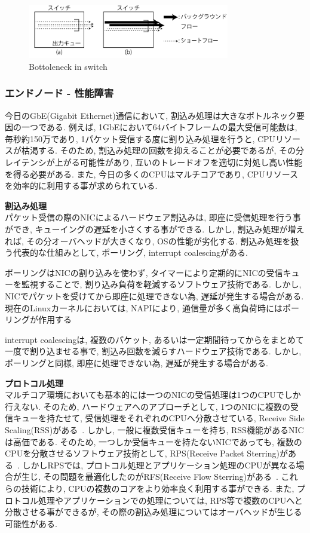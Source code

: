 \begin{figure}[t]
    \begin{center}
    \includegraphics[autoebb, width=250pt]{./img/impairments.pdf}
    \caption{Bottoleneck in switch}
    \label{fig:impair}
    \end{center}
\end{figure}


\subsubsection{エンドノード - 性能障害}
今日のGbE(Gigabit Ethernet)通信において, 割込み処理は大きなボトルネック要因の一つである.
例えば, 1GbEにおいて64バイトフレームの最大受信可能数は, 毎秒約150万であり, 1パケット受信する度に割り込み処理を行うと,
CPUリソースが枯渇する.
そのため, 割込み処理の回数を抑えることが必要であるが, その分レイテンシが上がる可能性があり, 互いのトレードオフを適切に対処し高い性能を得る必要がある.
また, 今日の多くのCPUはマルチコアであり, CPUリソースを効率的に利用する事が求められている.

{\bf 割込み処理}\\
パケット受信の際のNICによるハードウェア割込みは, 即座に受信処理を行う事ができ, キューイングの遅延を小さくする事ができる.
しかし, 割込み処理が増えれば, その分オーバヘッドが大きくなり, OSの性能が劣化する.
割込み処理を扱う代表的な仕組みとして, ポーリング, interrupt coalescingがある.

ポーリングはNICの割り込みを使わず, タイマーにより定期的にNICの受信キューを監視することで, 割り込み負荷を軽減するソフトウェア技術である.
しかし, NICでパケットを受けてから即座に処理できない為, 遅延が発生する場合がある.
現在のLinuxカーネルにおいては, NAPIにより, 通信量が多く高負荷時にはポーリングが作用する~\cite{NAPI}

interrupt coalescingは, 複数のパケット, あるいは一定期間待ってからをまとめて一度で割り込ませる事で,
割込み回数を減らすハードウェア技術である.
しかし, ポーリングと同様, 即座に処理できない為, 遅延が発生する場合がある.

{\bf プロトコル処理}\\
マルチコア環境においても基本的には一つのNICの受信処理は1つのCPUでしか行えない.
そのため, ハードウェアへのアプローチとして, 1つのNICに複数の受信キューを持たせて, 受信処理をそれぞれのCPUへ分散させている, Receive
Side Scaling(RSS)がある~\cite{RSS}.
しかし, 一般に複数受信キューを持ち, RSS機能があるNICは高価である\cite{intel}.
そのため, 一つしか受信キューを持たないNICであっても, 複数のCPUを分散させるソフトウェア技術として, RPS(Receive Packet
Sterring)がある~\cite{RPS}.
しかしRPSでは, プロトコル処理とアプリケーション処理のCPUが異なる場合が生じ, その問題を最適化したのがRFS(Receive Flow
Sterring)がある~\cite{RFS}.
これらの技術により, CPUの複数のコアをより効率良く利用する事ができる.
また, プロトコル処理やアプリケーションでの処理については, RPS等で複数のCPUへと分散させる事ができるが,
その際の割込み処理についてはオーバヘッドが生じる可能性がある.


